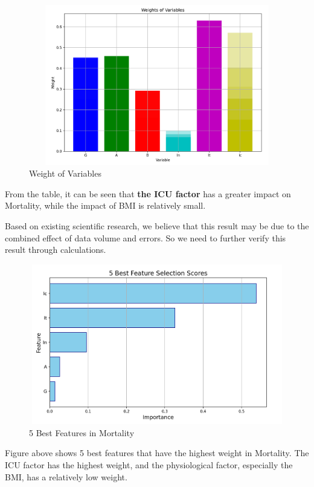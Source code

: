 \documentclass[13pt]{ctexart}
\begin{document}
\begin{figure}[h]
    \centering
        \includegraphics[width=12cm,height=7cm]{pics/3.png}
        \caption{Weight of Variables}
\end{figure}

From the table, it can be seen that \textbf{the ICU factor} has a greater impact on Mortality, while the impact of BMI is relatively small. 

Based on existing scientific research, we believe that this result may be due to the combined effect of data volume and errors. So we need to further verify this result through calculations.
\begin{figure}[h]
    \centering
        \includegraphics[width=12cm,height=7cm]{pics/ex3.png}
        \caption{5 Best Features in Mortality}
\end{figure}

Figure above shows 5 best features that have the highest weight in Mortality. The ICU factor has the highest weight, and the physiological factor, especially the BMI, has a relatively low weight. 
\end{document}
